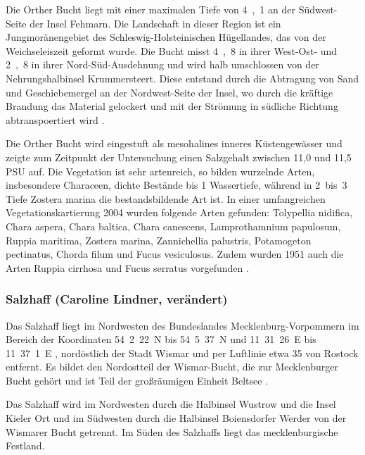 Die Orther Bucht liegt mit einer maximalen Tiefe von \unit{4,1}{\metre} \citep{seekartefehmarnsundkartograph_unbekannt_1902} an der Südwest- Seite der Insel Fehmarn. Die Landschaft in dieser Region ist ein Jungmoränengebiet des Schleswig-Holsteinischen Hügellandes, das von der Weichseleiszeit geformt wurde. Die Bucht misst \unit{4,8}{\kilo\metre} in ihrer West-Ost- und \unit{2,8}{\kilo\metre} in ihrer Nord-Süd-Ausdehnung und wird halb umschlossen von der Nehrungshalbinsel Krummersteert. Diese entstand durch die Abtragung von Sand und Geschiebemergel an der Nordwest-Seite der Insel, wo durch die kräftige Brandung das Material gelockert und mit der Strömung in südliche Richtung abtranspoertiert wird \citep{eschwe_2005}.

Die Orther Bucht wird eingestuft als mesohalines inneres Küstengewässer \citep{reimers_2005} und zeigte zum Zeitpunkt der Untersuchung einen Salzgehalt zwischen 11,0 und 11,5 PSU auf.
Die Vegetation ist sehr artenreich, so bilden wurzelnde Arten, insbesondere Characeen, dichte Bestände bis \unit{1}{\metre} Wassertiefe, während in \unit{2 bis 3}{\metre} Tiefe Zostera marina die bestandsbildende Art ist. In einer umfangreichen Vegetationskartierung 2004 wurden folgende Arten gefunden: Tolypellia nidifica, Chara aspera, Chara baltica, Chara canescens, Lamprothamnium papulosum, Ruppia maritima, Zostera marina, Zannichellia palustris, Potamogeton pectinatus, Chorda filum und Fucus vesiculosus. Zudem wurden 1951 auch die Arten Ruppia cirrhosa und Fucus serratus vorgefunden \citep{mertens_2007}.



\subsubsection{Salzhaff (Caroline Lindner, verändert)}

Das Salzhaff liegt im Nordwesten des Bundeslandes Mecklenburg-Vorpommern im Bereich der Koordinaten 54\textdegree\ 2\textquotesingle\ 22\dq\ N bis 54\textdegree\ 5\textquotesingle\ 37\dq\ N und 11\textdegree\ 31\textquotesingle\ 26\dq\ E bis 11\textdegree\ 37\textquotesingle\ 1\dq\ E \citep{nathansen_2014}, nordöstlich der Stadt Wismar und per Luftlinie etwa \unit{35}{\kilo\metre} von Rostock entfernt. Es bildet den Nordostteil der Wismar-Bucht, die zur Mecklenburger Bucht gehört und ist Teil der großräumigen Einheit Beltsee \cite{biele_1997}.

Das Salzhaff wird im Nordwesten durch die Halbinsel Wustrow und die Insel Kieler Ort und im Südwesten durch die Halbinsel Boiensdorfer Werder von der Wismarer Bucht getrennt. Im Süden des Salzhaffs liegt das mecklenburgische Festland.

